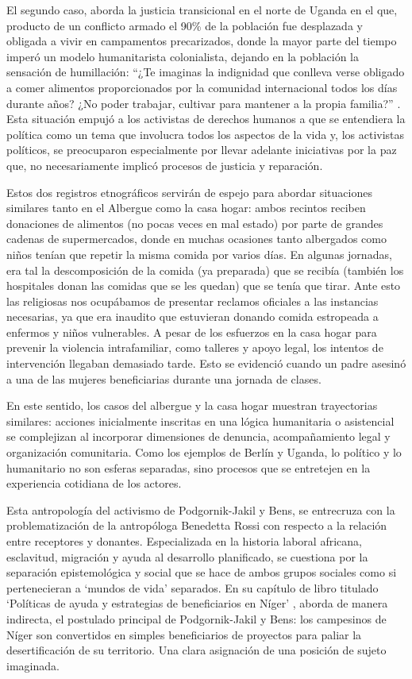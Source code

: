 \documentclass[
  spanish,
  11pt,
  a4paper,
]{scrbook}
\begin{document}
El segundo caso, aborda la justicia transicional en el norte de Uganda
en el que, producto de un conflicto armado el 90\% de la población fue
desplazada y obligada a vivir en campamentos precarizados, donde la
mayor parte del tiempo imperó un modelo humanitarista colonialista,
dejando en la población la sensación de humillación: ``¿Te imaginas la
indignidad que conlleva verse obligado a comer alimentos proporcionados
por la comunidad internacional todos los días durante años? ¿No poder
trabajar, cultivar para mantener a la propia familia?''
\autocite[307]{PodgornikJakil2021}. Esta situación empujó a los
activistas de derechos humanos a que se entendiera la política como un
tema que involucra todos los aspectos de la vida y, los activistas
políticos, se preocuparon especialmente por llevar adelante iniciativas
por la paz que, no necesariamente implicó procesos de justicia y
reparación.

Estos dos registros etnográficos servirán de espejo para abordar
situaciones similares tanto en el Albergue como la casa hogar: ambos
recintos reciben donaciones de alimentos (no pocas veces en mal estado)
por parte de grandes cadenas de supermercados, donde en muchas ocasiones
tanto albergados como niños tenían que repetir la misma comida por
varios días. En algunas jornadas, era tal la descomposición de la comida
(ya preparada) que se recibía (también los hospitales donan las comidas
que se les quedan) que se tenía que tirar. Ante esto las religiosas nos
ocupábamos de presentar reclamos oficiales a las instancias necesarias,
ya que era inaudito que estuvieran donando comida estropeada a enfermos
y niños vulnerables. A pesar de los esfuerzos en la casa hogar para
prevenir la violencia intrafamiliar, como talleres y apoyo legal, los
intentos de intervención llegaban demasiado tarde. Esto se evidenció
cuando un padre asesinó a una de las mujeres beneficiarias durante una
jornada de clases.

En este sentido, los casos del albergue y la casa hogar muestran
trayectorias similares: acciones inicialmente inscritas en una lógica
humanitaria o asistencial se complejizan al incorporar dimensiones de
denuncia, acompañamiento legal y organización comunitaria. Como los
ejemplos de Berlín y Uganda, lo político y lo humanitario no son esferas
separadas, sino procesos que se entretejen en la experiencia cotidiana
de los actores.

Esta antropología del activismo de Podgornik-Jakil y Bens, se entrecruza
con la problematización de la antropóloga Benedetta Rossi con respecto a
la relación entre receptores y donantes. Especializada en la historia
laboral africana, esclavitud, migración y ayuda al desarrollo
planificado, se cuestiona por la separación epistemológica y social que
se hace de ambos grupos sociales como si pertenecieran a `mundos de
vida' separados. En su capítulo de libro titulado `Políticas de ayuda y
estrategias de beneficiarios en Níger' \autocite{Rossi2006}, aborda de
manera indirecta, el postulado principal de Podgornik-Jakil y Bens: los
campesinos de Níger son convertidos en simples beneficiarios de
proyectos para paliar la desertificación de su territorio. Una clara
asignación de una posición de sujeto imaginada.
\end{document}
